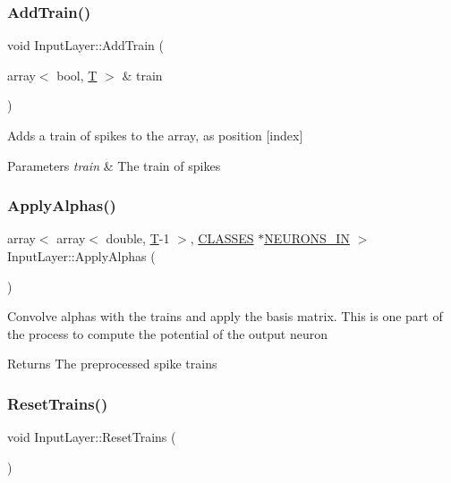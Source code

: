 \subsubsection{\texorpdfstring{Add\+Train()}{AddTrain()}}
{\footnotesize\ttfamily void Input\+Layer\+::\+Add\+Train (\begin{DoxyParamCaption}\item[{array$<$ bool, \mbox{\hyperlink{_constants_8h_a6108cec236ef7a2e1d3259931de87186}{T}} $>$ \&}]{train }\end{DoxyParamCaption})}

Adds a train of spikes to the array, as position \mbox{[}index\mbox{]} 
\begin{DoxyParams}{Parameters}
{\em train} & The train of spikes \\
\hline
\end{DoxyParams}
\mbox{\label{class_input_layer_a4bbcf9d128d6552c65fb3f9a2cc5d1c7}} 
\subsubsection{\texorpdfstring{Apply\+Alphas()}{ApplyAlphas()}}
{\footnotesize\ttfamily array$<$ array$<$ double, \mbox{\hyperlink{_constants_8h_a6108cec236ef7a2e1d3259931de87186}{T}}-\/1 $>$, \mbox{\hyperlink{_constants_8h_a12148c0e36153a905f4f6ef1afdbb27e}{C\+L\+A\+S\+S\+ES}} $\ast$\mbox{\hyperlink{_constants_8h_aefc2426e4681da445c7793c98a83c532}{N\+E\+U\+R\+O\+N\+S\+\_\+\+IN}} $>$ Input\+Layer\+::\+Apply\+Alphas (\begin{DoxyParamCaption}{ }\end{DoxyParamCaption})}

Convolve alphas with the trains and apply the basis matrix. This is one part of the process to compute the potential of the output neuron \begin{DoxyReturn}{Returns}
The preprocessed spike trains 
\end{DoxyReturn}
\mbox{\label{class_input_layer_a1959584bdc493411f3f2ed4648636e26}} 
\subsubsection{\texorpdfstring{Reset\+Trains()}{ResetTrains()}}
{\footnotesize\ttfamily void Input\+Layer\+::\+Reset\+Trains (\begin{DoxyParamCaption}{ }\end{DoxyParamCaption})}

